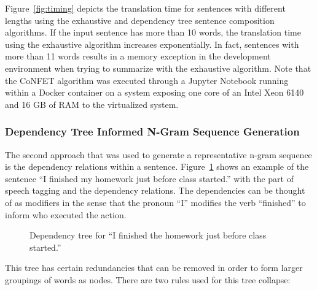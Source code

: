 \documentclass{article}[10]
\begin{document}
Figure~\ref{fig:timing} depicts the translation time for sentences with different lengths using the exhaustive and dependency tree sentence composition algorithms. If the input sentence has more than 10 words, the translation time using the exhaustive algorithm increases exponentially. In fact, sentences with more than 11 words results in a memory exception in the development environment when trying to summarize with the exhaustive algorithm. Note that the CoNFET algorithm was executed through a Jupyter Notebook running within a Docker container on a system exposing one core of an Intel Xeon 6140 and 16 GB of RAM to the virtualized system.

\subsubsection{Dependency Tree Informed N-Gram Sequence Generation\label{sec:dependency}}

The second approach that was used to generate a representative n-gram sequence is the dependency relations within a sentence. Figure~\ref{fig:dep} shows an example of the sentence ``I finished my homework just before class started.'' with the part of speech tagging and the dependency relations. The dependencies can be thought of as modifiers in the sense that the pronoun ``I'' modifies the verb ``finished'' to inform who executed the action.

\begin{figure}[H]
  \begin{center}
    \caption{Dependency tree for ``I finished the homework just before class
      started.''\label{fig:dep}}
  \end{center}
\end{figure}

This tree has certain redundancies that can be removed in order to form larger groupings of words as nodes. There are two rules used for this tree collapse:
\end{document}
